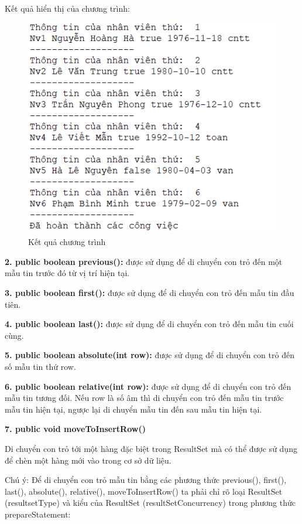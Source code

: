 Kết quả hiển thị của chương trình:

\begin{figure}[!ht]
	\centering
	\includegraphics[scale=0.9]{Figures//Hinh36.png}
	\caption{ Kết quả chương trình }\label{hinh36} 
\end{figure}

 
\textbf{2. public boolean previous():}	được sử dụng để di chuyển con trỏ đến một mẫu tin trước đó từ vị trí hiện tại.

\textbf{3. public boolean first():}	được sử dụng để di chuyển con trỏ đến mẫu tin đầu tiên.

\textbf{4. public boolean last():}	được sử dụng để di chuyển con trỏ đến mẫu tin cuối cùng.

\textbf{5. public boolean absolute(int row):}	được sử dụng để di chuyển con trỏ đến số mẫu tin thứ row.

\textbf{6. public boolean relative(int row):}	được sử dụng để di chuyển con trỏ đến mẫu tin tương đối. Nếu row là số âm thì di chuyển con trỏ đến mẫu tin trước mẫu tin hiện tại, ngược lại di chuyển mẫu tin đến sau mẫu tin hiện tại.

\textbf{7. public void moveToInsertRow() }

Di chuyển con trỏ tới một hàng đặc biệt trong ResultSet mà có thể được sử dụng để chèn một hàng mới vào trong cơ sở dữ liệu. 

Chú ý: Để di chuyển con trỏ mẫu tin bằng các phương thức previous(), first(), last(), absolute(), relative(), moveToInsertRow() ta phải chỉ rõ loại ResultSet (resultsetType) và kiểu của ResultSet (resultSetConcurrency) trong phương thức prepareStatement:

